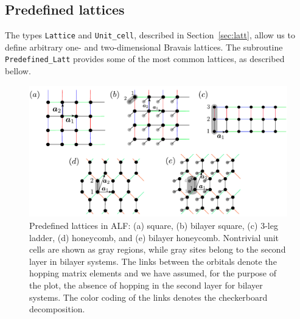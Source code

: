 %
\subsection{Predefined lattices} \label{sec:predefined_lattices}


The types \texttt{Lattice} and \texttt{Unit\_cell}, described in Section~\ref{sec:latt}, allow us to define arbitrary one- and two-dimensional Bravais lattices. The subroutine \texttt{Predefined\_Latt} provides some of the most common lattices, as described bellow.

\begin{figure}
        \begin{center}
                \includegraphics[width=\textwidth]{Figures/Lattices_all.pdf}
                \caption{Predefined lattices in ALF: (a) square, (b) bilayer square, (c) 3-leg ladder, (d) honeycomb, and (e) bilayer honeycomb. Nontrivial unit cells are shown as gray regions, while gray sites belong to the second layer in bilayer systems.   The links between the orbitals denote the hopping matrix elements and we have assumed, for the purpose of the plot, the absence of hopping in the second layer for bilayer systems. The color coding of the links denotes the checkerboard decomposition.}
                \label{fig_predefined_lattices}
        \end{center}
\end{figure}

